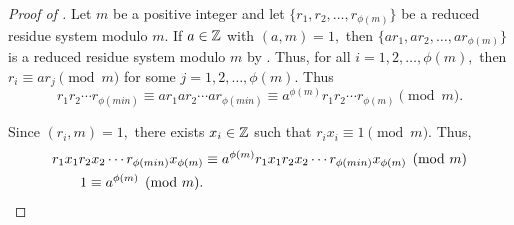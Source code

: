 \documentclass{ximera}
\begin{document}
\begin{proof}[Proof of ]
    Let $m$ be a positive integer and let $\{r_1,r_2,\dots,r_{\phi(m)}\}$ be a reduced residue system modulo $m.$ If $a\in\mathbb Z$ with $(a,m)=1,$ then $\{ar_1,ar_2,\dots,ar_{\phi(m)}\}$ is a reduced residue system modulo $m$ by . Thus, for all $i=1,2,\dots, \phi(m),$ then $r_i\equiv a r_j\pmod{m}$ for some $j=1,2,\dots,\phi(m).$ Thus \[r_1 r_2\cdots r_{\phi(min)}\equiv ar_1 ar_2\cdots ar_{\phi(min)}\equiv a^{\phi(m)}r_1 r_2\cdots r_{\phi(m)} \pmod{m}.\]

    Since $(r_i,m)=1,$ there exists $x_i\in\mathbb Z$ such that $r_i x_i\equiv 1\pmod{m}.$ Thus, 
    \begin{align*}
        r_1 x_1 r_2 x_2\cdots r_{\phi(min)} x_{\phi(m)}&\equiv a^{\phi(m)} r_1 x_1 r_2 x_2\cdots r_{\phi(min)} x_{\phi(m)} \pmod{m}\\
        1\equiv a^{\phi(m)} \pmod{m}.\qedhere
    \end{align*}
\end{proof}
\end{document}
